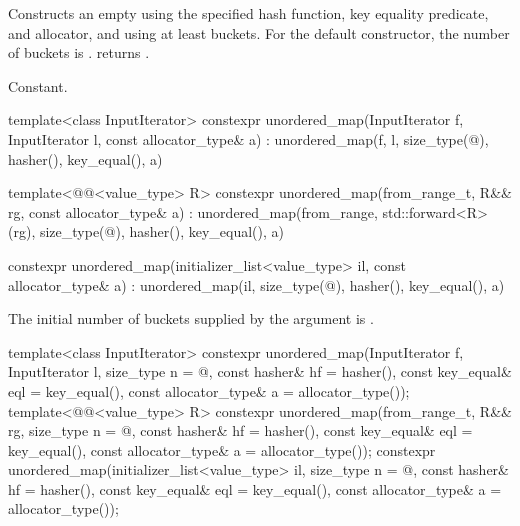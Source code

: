 \begin{itemdescr}
\pnum
\effects
Constructs an empty  using the
specified hash function, key equality predicate, and allocator, and
using at least  buckets.  For the default constructor,
the number of buckets is .
 returns .

\pnum
\complexity
Constant.
\end{itemdescr}

%
\begin{itemdecl}
template<class InputIterator>
  constexpr unordered_map(InputIterator f, InputIterator l, const allocator_type& a)
    : unordered_map(f, l,
                    size_type(@\seebelow@), hasher(), key_equal(), a) { }

template<@@<value_type> R>
  constexpr unordered_map(from_range_t, R&& rg, const allocator_type& a)
    : unordered_map(from_range, std::forward<R>(rg),
                    size_type(@\seebelow@), hasher(), key_equal(), a) { }

constexpr unordered_map(initializer_list<value_type> il, const allocator_type& a)
  : unordered_map(il, size_type(@\seebelow@), hasher(), key_equal(), a) { }
\end{itemdecl}

\begin{itemdescr}
\pnum
\remarks
The initial number of buckets supplied by the  argument is
.
\end{itemdescr}

%
\begin{itemdecl}
template<class InputIterator>
  constexpr unordered_map(InputIterator f, InputIterator l,
                          size_type n = @\seebelow@, const hasher& hf = hasher(),
                          const key_equal& eql = key_equal(),
                          const allocator_type& a = allocator_type());
template<@@<value_type> R>
  constexpr unordered_map(from_range_t, R&& rg,
                          size_type n = @\seebelow@, const hasher& hf = hasher(),
                          const key_equal& eql = key_equal(),
                          const allocator_type& a = allocator_type());
constexpr unordered_map(initializer_list<value_type> il,
                        size_type n = @\seebelow@, const hasher& hf = hasher(),
                        const key_equal& eql = key_equal(),
                        const allocator_type& a = allocator_type());
\end{itemdecl}

